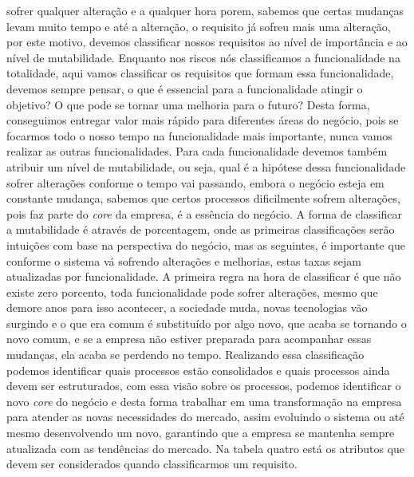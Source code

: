         sofrer qualquer alteração e a qualquer hora porem, sabemos que certas
        mudanças levam muito tempo e até a alteração, o requisito já sofreu mais uma
        alteração, por este motivo, devemos classificar nossos requisitos ao nível
        de importância e ao nível de mutabilidade. Enquanto nos riscos nós classificamos
        a funcionalidade na totalidade, aqui vamos classificar os requisitos que formam
        essa funcionalidade, devemos sempre pensar, o que é essencial para a funcionalidade
        atingir o objetivo? O que pode se tornar uma melhoria para o futuro? Desta
        forma, conseguimos entregar valor mais rápido para diferentes áreas do negócio,
        pois se focarmos todo o nosso tempo na funcionalidade mais importante, nunca
        vamos realizar as outras funcionalidades. Para cada funcionalidade devemos
        também atribuir um nível de mutabilidade, ou seja, qual é a hipótese dessa
        funcionalidade sofrer alterações conforme o tempo vai passando, embora o
        negócio esteja em constante mudança, sabemos que certos processos dificilmente
        sofrem alterações, pois faz parte do \textit{core} da empresa, é a essência
        do negócio. A forma de classificar a mutabilidade é através de porcentagem,
        onde as primeiras classificações serão intuições com base na perspectiva do
        negócio, mas as seguintes, é importante que conforme o sistema vá sofrendo
        alterações e melhorias, estas taxas sejam atualizadas por funcionalidade.
        A primeira regra na hora de classificar é que não existe zero porcento, toda
        funcionalidade pode sofrer alterações, mesmo que demore anos para isso acontecer,
        a sociedade muda, novas tecnologias vão surgindo e o que era comum é substituído
        por algo novo, que acaba se tornando o novo comum, e se a empresa não estiver
        preparada para acompanhar essas mudanças, ela acaba se perdendo no tempo.
        Realizando essa classificação podemos identificar quais processos estão
        consolidados e quais processos ainda devem ser estruturados, com essa visão
        sobre os processos, podemos identificar o novo \textit{core} do negócio e
        desta forma trabalhar em uma transformação na empresa para atender as novas
        necessidades do mercado, assim evoluindo o sistema ou até mesmo desenvolvendo
        um novo, garantindo que a empresa se mantenha sempre atualizada com as tendências
        do mercado. Na tabela quatro está os atributos que devem ser considerados
        quando classificarmos um requisito.\newline

